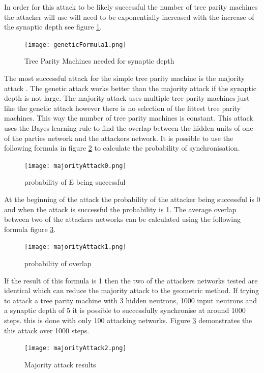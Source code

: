 In order for this attack to be likely successful the number of tree parity machines the attacker will use will need to be exponentially increased with the increase of the synaptic depth see figure \ref{fig:geneticEMachine}.
\begin{figure}[ht]
  \centering
      \texttt{[image: geneticFormula1.png]}
  \caption[Tree Parity Machines needed for synaptic depth]{Tree Parity Machines needed for synaptic depth\cite{BIG_ResearchPaper}}
  \label{fig:geneticEMachine}
\end{figure}

The most successful attack for the simple tree parity machine is the majority attack \cite{BIG_ResearchPaper}. The genetic attack works better than the majority attack if the synaptic depth is not large. The majority attack uses multiple tree parity machines just like the genetic attack however there is no selection of the fittest tree parity machines. This way the number of tree parity machines is constant. This attack uses the Bayes learning rule \cite{Bayes_rule} to find the overlap between the hidden units of one of the parties network and the attackers network.
It is possible to use the following formula in figure \ref{fig:majority0} to calculate the probability of synchronisation. 
\begin{figure}[ht]
  \centering
      \texttt{[image: majorityAttack0.png]}
  \caption[probability of E being successful]{probability of E being successful\cite{BIG_ResearchPaper}}
  \label{fig:majority0}
\end{figure}
At the beginning of the attack the probability of the attacker being successful is 0 and when the attack is successful the probability is 1.
The average overlap between two of the attackers networks can be calculated using the following formula figure \ref{fig:majority1}.
\begin{figure}[ht]
  \centering
      \texttt{[image: majorityAttack1.png]}
  \caption[probability of overlap]{probability of overlap\cite{BIG_ResearchPaper}}
  \label{fig:majority1}
\end{figure}
If the result of this formula is 1 then the two of the attackers networks tested are identical which can reduce the majority attack to the geometric method.
If trying to attack a tree parity machine with 3 hidden neutrons, 1000 input neutrons and a synaptic depth of 5 it is possible to successfully synchronise at around 1000 steps. this is done with only 100 attacking networks. Figure \ref{fig:majority1} demonstrates the this attack over 1000 steps.
\begin{figure}[ht]
  \centering
      \texttt{[image: majorityAttack2.png]}
  \caption[Majority attack results]{Majority attack results\cite{BIG_ResearchPaper}}
  \label{fig:majority2}
\end{figure}
%
%
%
%

